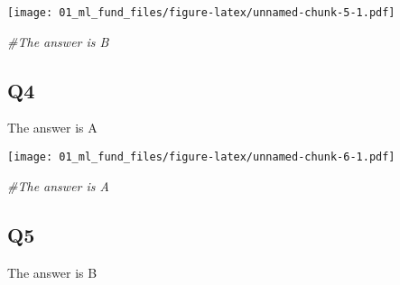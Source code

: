 \documentclass[
]{article}
\newenvironment{Shaded}{\begin{snugshade}}{\end{snugshade}}
\newcommand{\CommentTok}[1]{\textcolor[rgb]{0.56,0.35,0.01}{\textit{#1}}}
\newcommand{\KeywordTok}[1]{\textcolor[rgb]{0.13,0.29,0.53}{\textbf{#1}}}
\newcommand{\NormalTok}[1]{#1}
\newcommand{\OperatorTok}[1]{\textcolor[rgb]{0.81,0.36,0.00}{\textbf{#1}}}
\newcommand{\StringTok}[1]{\textcolor[rgb]{0.31,0.60,0.02}{#1}}
\begin{document}
\texttt{[image: 01\_ml\_fund\_files/figure-latex/unnamed-chunk-5-1.pdf]}

\begin{Shaded}
\begin{Highlighting}[]
\CommentTok{#The answer is B}
\end{Highlighting}
\end{Shaded}

\hypertarget{q4}{%
\subsection{Q4}\label{q4}}

The answer is A

\begin{Shaded}
\end{Shaded}

\texttt{[image: 01\_ml\_fund\_files/figure-latex/unnamed-chunk-6-1.pdf]}

\begin{Shaded}
\begin{Highlighting}[]
\CommentTok{#The answer is A}
\end{Highlighting}
\end{Shaded}

\hypertarget{q5}{%
\subsection{Q5}\label{q5}}

The answer is B

\begin{Shaded}
\end{Shaded}
\end{document}

